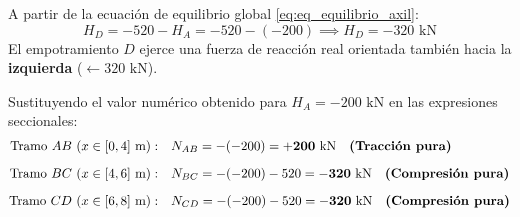 A partir de la ecuación de equilibrio global \eqref{eq:eq_equilibrio_axil}:
\begin{equation}
    H_D = -520 - H_A = -520 - (-200) \implies \boxed{H_D = -320\text{ kN}}
\end{equation}
El empotramiento $D$ ejerce una fuerza de reacción real orientada también hacia la \textbf{izquierda} ($\leftarrow 320\text{ kN}$).



Sustituyendo el valor numérico obtenido para $H_A = -200\text{ kN}$ en las expresiones seccionales:
\begin{align}
    \text{Tramo } AB \ (x \in [0, 4]\text{ m}): & \quad N_{AB} = -(-200) = \mathbf{+200\text{ kN}} \quad \text{\textbf{(Tracción pura)}} \\[6pt]
    \text{Tramo } BC \ (x \in [4, 6]\text{ m}): & \quad N_{BC} = -(-200) - 520 = \mathbf{-320\text{ kN}} \quad \text{\textbf{(Compresión pura)}} \\[6pt]
    \text{Tramo } CD \ (x \in [6, 8]\text{ m}): & \quad N_{CD} = -(-200) - 520 = \mathbf{-320\text{ kN}} \quad \text{\textbf{(Compresión pura)}}
\end{align}

